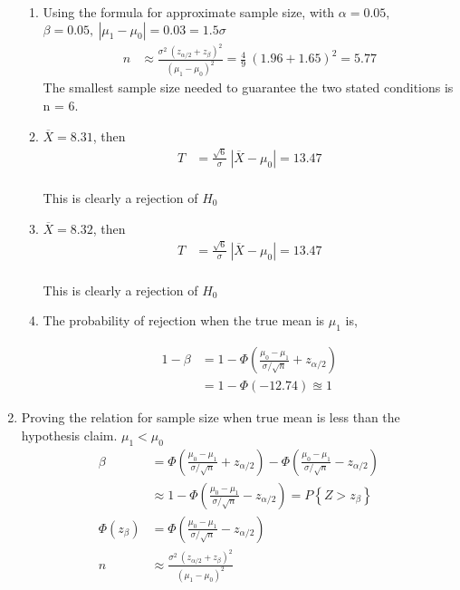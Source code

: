 \begin{enumerate}
\begin{enumerate}
			\item Using the formula for approximate sample size, with $ \alpha = 0.05,$ \\
			$ \beta = 0.05,\ |\mu_1 - \mu_0| = 0.03 = 1.5\sigma $\\
			\begin{align}
				n &\approx \frac{\sigma^2\ (z_{\alpha/2} + z_\beta)^2}{(\mu_1 - \mu_0)^2} = \frac{4}{9}\ (1.96 + 1.65)^2 = 5.77
			\end{align}
			The smallest sample size needed to guarantee the two stated conditions is n = 6.
			
			\item $ \overline{X} = 8.31 $, then\\
			\begin{align}
				T &= \frac{\sqrt{6}}{\sigma}\ |\overline{X} - \mu_0| = 13.47 \nonumber \\
			\end{align}
			
			This is clearly a rejection of $ H_0 $\\
			
			\item $ \overline{X} = 8.32 $, then\\
			\begin{align}
				T &= \frac{\sqrt{6}}{\sigma}\ |\overline{X} - \mu_0| = 13.47 \nonumber \\
			\end{align}
			
			This is clearly a rejection of $ H_0 $\\
			
			\item The probability of rejection when the true mean is $ \mu_1 $ is,
			
			\begin{align}
				1 - \beta &= 1 - \Phi\left(\frac{\mu_0 - \mu_1}{\sigma/\sqrt{n}} + z_{\alpha/2}\right) \nonumber \\
				&= 1 - \Phi(-12.74) \approxeq 1
			\end{align}
		\end{enumerate}
	
	\item Proving the relation for sample size when true mean is less than the hypothesis claim. $ \mu_1 < \mu_0 $\\
	
		\begin{align}
			\beta &= \Phi\left(\frac{\mu_0 - \mu_1}{\sigma/\sqrt{n}} + z_{\alpha/2}\right) - \Phi\left( \frac{\mu_0 - \mu_1}{\sigma/\sqrt{n}} - z_{\alpha/2} \right)  \\
			&\approx 1 - \Phi\left(\frac{\mu_0 - \mu_1}{\sigma/\sqrt{n}} - z_{\alpha/2}\right) = P\left\{Z > z_\beta\right\} \nonumber \\
			\Phi(z_\beta) &= \Phi\left(\frac{\mu_0 - \mu_1}{\sigma/\sqrt{n}} - z_{\alpha/2}\right) \nonumber \\
			n &\approx \frac{\sigma^2\ (z_{\alpha/2} + z_\beta)^2}{(\mu_1 - \mu_0)^2}
		\end{align}
	

\end{enumerate}
